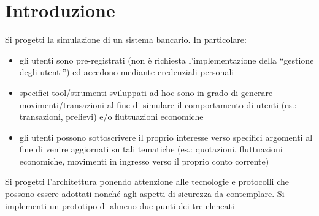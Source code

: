 \section{Introduzione}
Si progetti la simulazione di un sistema bancario.
In particolare:
\begin{itemize}
  \item gli utenti sono pre-registrati (non è richiesta l'implementazione della “gestione degli
utenti”) ed accedono mediante credenziali personali
  \item  specifici tool/strumenti sviluppati ad hoc sono in grado di generare movimenti/transazioni
al fine di simulare il comportamento di utenti (es.: transazioni, prelievi) e/o fluttuazioni
economiche
 \item gli utenti possono sottoscrivere il proprio interesse verso specifici argomenti al fine di
venire aggiornati su tali tematiche (es.: quotazioni, fluttuazioni economiche, movimenti in
ingresso verso il proprio conto corrente)
\end{itemize}
Si progetti l'architettura ponendo attenzione alle tecnologie e protocolli che possono essere
adottati nonché agli aspetti di sicurezza da contemplare.
Si implementi un prototipo di almeno due punti dei tre elencati